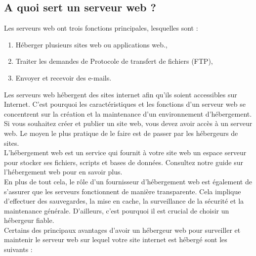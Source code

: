 \subsection{A quoi sert un serveur web ?}
Les serveurs web ont trois fonctions principales, lesquelles sont :
\begin{enumerate}
    	\item  Héberger plusieurs sites web ou applications web.,
	    \item  Traiter les demandes de Protocole de transfert de fichiers (FTP),
	    \item  Envoyer et recevoir des e-mails.
\end{enumerate}
Les serveurs web hébergent des sites internet afin qu’ils soient accessibles sur Internet. C’est pourquoi les caractéristiques et les fonctions d’un serveur web se concentrent sur la création et la maintenance d’un environnement d’hébergement.\\
Si vous souhaitez créer et publier un site web, vous devez avoir accès à un serveur web. Le moyen le plus pratique de le faire est de passer par les hébergeurs de sites.\\
L’hébergement web est un service qui fournit à votre site web un espace serveur pour stocker ses fichiers, scripts et bases de données. Consultez notre guide sur l’hébergement web pour en savoir plus.\\
En plus de tout cela, le rôle d’un fournisseur d’hébergement web est également de s’assurer que les serveurs fonctionnent de manière transparente. Cela implique d’effectuer des sauvegardes, la mise en cache, la surveillance de la sécurité et la maintenance générale. D’ailleurs, c’est pourquoi il est crucial de choisir un hébergeur fiable.\\
Certains des principaux avantages d’avoir un hébergeur web pour surveiller et maintenir le serveur web sur lequel votre site internet est hébergé sont les suivants :

